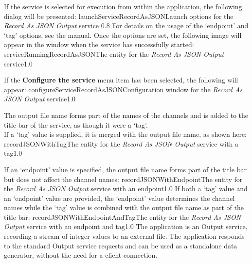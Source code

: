 \insertStandardServiceCommands

If the service is selected for execution from within the \emph{\MMMU} application, the
following dialog will be presented:
%
{launchServiceRecordAsJSON}{Launch options for the \emph{Record As JSON Output} service}%
{0.8}
\condPage{}
For details on the usage of the `endpoint' and `tag' options, see the \emph{\MMMU} manual.
Once the options are set, the following image will appear in the \emph{\MMMU} window when
the service has successfully started:
%
{serviceRunningRecordAsJSON}{The \emph{\MMMU} entity for the \emph{Record As JSON Output}
service}{1.0}

If the \textbf{Configure the service} menu item has been selected, the following will
appear:
%
{configureServiceRecordAsJSON}{Configuration window for the \emph{Record As JSON Output}
service}{1.0}

The output file name forms part of the names of the channels and is added to the title bar
of the service, as though it were a `tag'.\\

If a `tag' value is supplied, it is merged with the output file name, as shown here:
%
{recordJSONWithTag}{The \emph{\MMMU} entity for the \emph{Record As JSON Output} service
with a tag}{1.0}

If an `endpoint' value is specified, the output file name forms part of the title bar but
does not affect the channel names:
%
{recordJSONWithEndpoint}{The \emph{\MMMU} entity for the \emph{Record As JSON Output}
service with an endpoint}{1.0}
\condPage{}
If both a `tag' value and an `endpoint' value are provided, the `endpoint' value
determines the channel names while the `tag' value is combined with the output file name
as part of the title bar:
%
{recordJSONWithEndpointAndTag}{The \emph{\MMMU} entity for the \emph{Record As JSON
Output} service with an endpoint and tag}{1.0}
The  application is an Output
service, recording a stream of integer values to an external file.
The application responds to the standard Output service requests and can be used as a
standalone data generator, without the need for a client connection.\\

